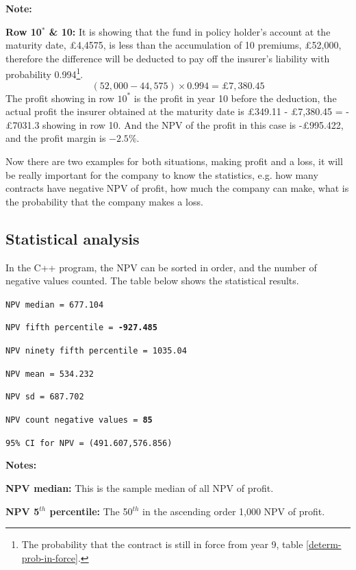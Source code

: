 \documentclass{report}
\begin{document}
\textbf{Note:}


\textbf{Row 10$^*$ \& 10:} It is showing that the fund in policy holder's account at the maturity date, \pounds 4,4575, is less than the accumulation of 10 premiums, \pounds 52,000, therefore the difference will be deducted to pay off the insurer's liability with probability 0.994\footnote{The probability that the contract is still in force from year 9, table \ref{determ-prob-in-force}.}. 
\[
(52,000- 44,575)\times 0.994= \pounds 7,380.45 
\]
The profit showing in row $10^*$ is the profit in year 10 before the deduction, the actual profit the insurer obtained at the maturity date is \pounds349.11 - \pounds7,380.45 = -\pounds 7031.3 showing in row 10. And the NPV of the profit in this case is -\pounds995.422, and the profit margin is $-2.5\%$.



Now there are two examples for both situations, making profit and a loss, it will be really important for the company to know the statistics, e.g. how many contracts have negative NPV of profit, how much the company can make, what is the probability that the company makes a loss.

\subsection{Statistical analysis}

In the C++ program, the NPV can be sorted in order, and the number of negative values counted. The table below shows the statistical results. 

\texttt{NPV median = 677.104}

{\renewcommand\baselinestretch{1}\selectfont


\texttt{NPV fifth percentile = \textbf{-927.485}}

\texttt{NPV ninety fifth percentile = 1035.04}

\texttt{NPV mean = 534.232}

\texttt{NPV sd = 687.702}

\texttt{NPV count negative values = \textbf{85}}

\texttt{95\% CI for NPV = (491.607,576.856)}
\par}

\textbf{Notes:} 

\textbf{NPV median:} This is the sample median of all NPV of profit.

\textbf{NPV 5$^{th}$ percentile:} The 50$^{th}$ in the ascending order 1,000 NPV of profit.
\end{document}
